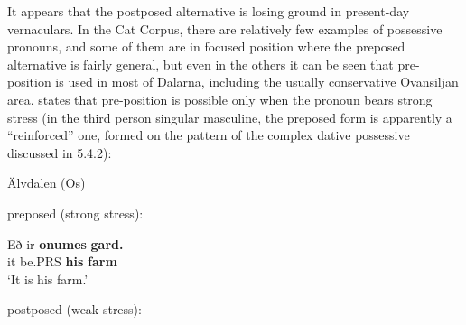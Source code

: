 
It appears that the postposed alternative is losing ground in present-day vernaculars. In the Cat Corpus, there are relatively few examples of possessive pronouns, and some of them are in focused position where the preposed alternative is fairly general, but even in the others it can be seen that pre-position is used in most of Dalarna, including the usually conservative Ovansiljan area. \citet[111]{Levander1909} states that pre-position is possible only when the pronoun bears strong stress (in the third person singular masculine, the preposed form is apparently a “reinforced” one, formed on the pattern of the complex dative possessive discussed in 5.4.2):


\item 

Älvdalen (Os)



\item 

preposed (strong stress):



 \ea\label{}
\gll Eð  ir  \textbf{onumes} \textbf{gard.}\\


it  be.PRS  \textbf{his} \textbf{farm}\\

\glt ‘It is his farm.’

\z

\item 

postposed (weak stress):

